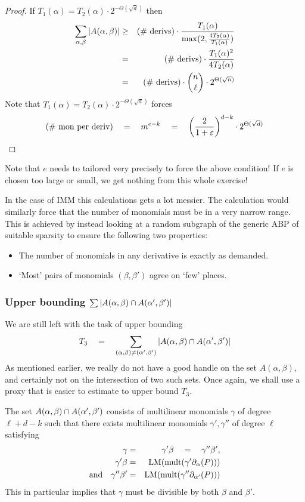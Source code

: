 \documentclass[12pt]{report}
\newcommand{\IMM}{\mathrm{IMM}}
\renewcommand{\epsilon}{\varepsilon}
\begin{document}
\begin{proof}
If $T_1(\alpha) = T_2(\alpha) \cdot 2^{-\Theta(\sqrt{d})}$ then
\begin{eqnarray*}
\sum_{\alpha,\beta}\left|A(\alpha, \beta)\right| &\geq& \text{(\# derivs)}\cdot \frac{T_1(\alpha)}{\max(2, \frac{4T_2(\alpha)}{T_1(\alpha)})}\\
 & = & \text{(\# derivs)} \cdot \frac{T_1(\alpha)^2}{4 T_2(\alpha)}\\
 & = & \text{(\# derivs)} \cdot \binom{n}{\ell} \cdot 2^{\Theta(\sqrt{n})}
\end{eqnarray*}
Note that $T_1(\alpha) = T_2(\alpha) \cdot 2^{-\Theta(\sqrt{d})}$ forces 
\[
\text{(\# mon per deriv)} \spaced{=}  m^{e-k} \spaced{=}  \inparen{\frac{2}{1+\epsilon}}^{d-k} \cdot 2^{\Theta(\sqrt{d})}
\]
\end{proof}

Note that $e$ needs to tailored very precisely to force the above condition! If $e$ is chosen too large or small, we get nothing from this whole exercise!

In the case of $\IMM$ this calculations gets a lot messier. The calculation would similarly force that the number of monomials must be in a very narrow range. This is achieved by instead looking at a random subgraph of the generic ABP of suitable sparsity to ensure the following two properties:
\begin{itemize}
  \item The number of monomials in any derivative is exactly as demanded. 
  \item `Most' pairs of monomials $(\beta, \beta')$ agree on `few' places. 
\end{itemize}

\subsubsection*{Upper bounding $\sum \left|A(\alpha,\beta)\cap A(\alpha',\beta')\right|$}

We are still left with the task of upper bounding
\[
T_3 \quad = \quad \sum_{(\alpha, \beta)\neq (\alpha',\beta')} \left|A(\alpha, \beta) \cap A(\alpha',\beta')\right|
\]
As mentioned earlier, we really do not have a good handle on the set $A(\alpha, \beta)$, and certainly not on the intersection of two such sets. Once again, we shall use a proxy that is easier to estimate to upper bound $T_3$. 

The set $A(\alpha, \beta) \cap A(\alpha',\beta')$ consists of multilinear monomials $\gamma$ of degree $\ell + d -k$ such that there exists multilinear monomials $\gamma', \gamma''$ of degree $\ell$ satisfying
\begin{eqnarray*}
\gamma & = & \gamma' \beta \quad = \quad \gamma'' \beta',\\
 \gamma'\beta & = & \mathrm{LM}(\mathrm{mult}(\gamma' \partial_\alpha(P)))\\
\text{and}\quad \gamma''\beta' & = & \mathrm{LM}(\mathrm{mult}(\gamma'' \partial_{\alpha'}(P)))
\end{eqnarray*}
This in particular implies that $\gamma$ must be divisible by both $\beta$ and $\beta'$. 
\end{document}
